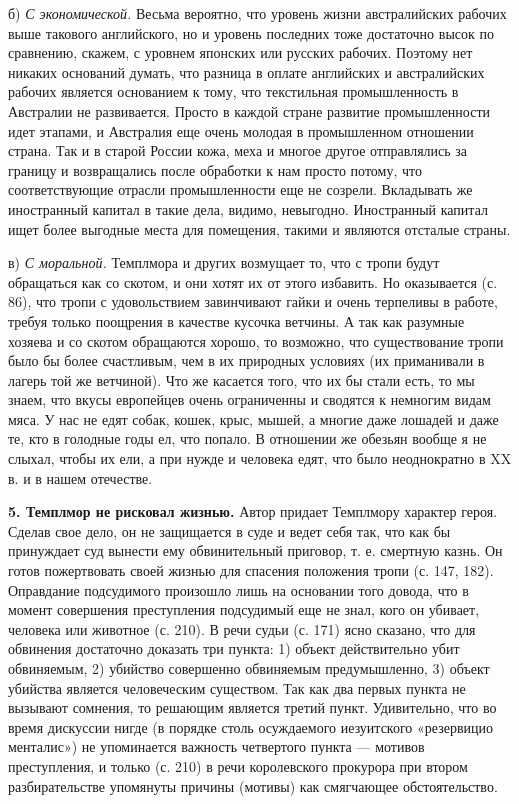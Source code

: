 б)  \emph{С   экономической.}  Весьма  вероятно,  что   уровень  жизни
австралийских  рабочих   выше  такового  английского,  но   и  уровень
последних  тоже  достаточно  высок  по сравнению,  скажем,  с  уровнем
японских или  русских рабочих.  Поэтому нет никаких  оснований думать,
что  разница  в оплате  английских  и  австралийских рабочих  является
основанием  к  тому, что  текстильная  промышленность  в Австралии  не
развивается.  Просто  в  каждой стране  развитие  промышленности  идет
этапами,  и  Австралия  еще  очень молодая  в  промышленном  отношении
страна. Так и в старой России  кожа, меха и многое другое отправлялись
за границу  и возвращались  после обработки к  нам просто  потому, что
соответствующие отрасли  промышленности еще не созрели.  Вкладывать же
иностранный  капитал  в  такие дела,  видимо,  невыгодно.  Иностранный
капитал ищет  более выгодные  места для  помещения, такими  и являются
отсталые страны.

в) \emph{С  моральной.} Темплмора и  других возмущает то, что  с тропи
будут обращаться как  со скотом, и они хотят их  от этого избавить. Но
оказывается (с.  86), что  тропи с  удовольствием завинчивают  гайки и
очень терпеливы в  работе, требуя только поощрения  в качестве кусочка
ветчины. А так как разумные хозяева  и со скотом обращаются хорошо, то
возможно, что существование  тропи было бы более счастливым,  чем в их
природных условиях (их  приманивали в лагерь той же  ветчиной). Что же
касается того, что их бы стали есть, то мы знаем, что вкусы европейцев
очень ограниченны  и сводятся  к немногим  видам мяса.  У нас  не едят
собак, кошек,  крыс, мышей,  а многие  даже лошадей и  даже те,  кто в
голодные  годы ел,  что попало.  В отношении  же обезьян  вообще я  не
слыхал,  чтобы  их  ели,  а  при  нужде  и  человека  едят,  что  было
неоднократно в XX в. и в нашем отечестве.

\textbf{5.  Темплмор  не  рисковал жизнью.}  Автор  придает  Темплмору
характер героя. Сделав свое дело, он не защищается в суде и ведет себя
так, что как бы принуждает  суд вынести ему обвинительный приговор, т.
е. смертную  казнь. Он  готов пожертвовать  своей жизнью  для спасения
положения тропи  (с. 147, 182). Оправдание  подсудимого произошло лишь
на  основании  того  довода,  что  в  момент  совершения  преступления
подсудимый еще  не знал,  кого он убивает,  человека или  животное (с.
210). В речи судьи (с. 171) ясно сказано, что для обвинения достаточно
доказать  три  пункта: 1)  объект  действительно  убит обвиняемым,  2)
убийство  совершенно  обвиняемым  предумышленно,  3)  объект  убийства
является человеческим существом. Так как два первых пункта не вызывают
сомнения, то решающим является третий пункт. Удивительно, что во время
дискуссии нигде  (в порядке столь осуждаемого  иезуитского «резервицио
менталис»)  не  упоминается  важность четвертого  пункта  ---  мотивов
преступления,  и только  (с. 210)  в речи  королевского прокурора  при
втором  разбирательстве  упомянуты  причины  (мотивы)  как  смягчающее
обстоятельство.

